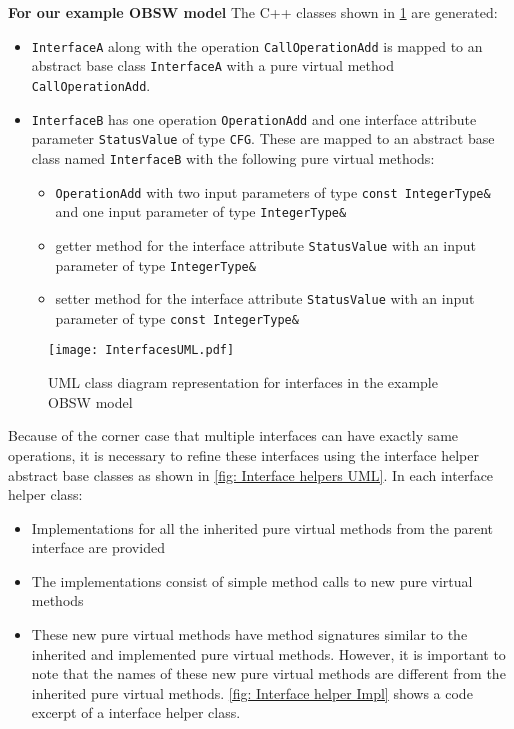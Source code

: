 \textbf{For our example OBSW model} The C++ classes shown in \cref{fig: InterfacesUML} are generated:
\begin{itemize}
\item \texttt{InterfaceA} along with the operation \texttt{CallOperationAdd} is mapped to an abstract base class \texttt{InterfaceA} with a pure virtual method \texttt{CallOperationAdd}. 
\item \texttt{InterfaceB} has one operation \texttt{OperationAdd} and one interface attribute parameter \texttt{StatusValue} of type \texttt{CFG}. These are mapped to an abstract base class named \texttt{InterfaceB} with the following pure virtual methods:
\begin{itemize}
\item \texttt{OperationAdd} with two input parameters of type \texttt{const\allowbreak \ IntegerType\&} and one input parameter of type \texttt{IntegerType\&}
\item getter method for the interface attribute \texttt{StatusValue} with an input parameter of type \texttt{IntegerType\&}
\item setter method for the interface attribute \texttt{StatusValue} with an input parameter of type \texttt{const\allowbreak \ IntegerType\&}
\end{itemize} 
\end{itemize}

\begin{figure}[h]
	\centering
	\texttt{[image: InterfacesUML.pdf]}
	\caption{UML class diagram representation for interfaces in the example OBSW model}
	\label{fig: InterfacesUML}
\end{figure}

Because of the corner case that multiple interfaces can have exactly same operations, it is necessary to refine these interfaces using the interface helper abstract base classes as shown in \cref{fig: Interface helpers UML}. In each interface helper class:
\begin{itemize}
\item Implementations for all the inherited pure virtual methods from the parent interface are provided
\item The implementations consist of simple method calls to new pure virtual methods
\item These new pure virtual methods have method signatures similar to the inherited and implemented pure virtual methods. However, it is important to note that the names of these new pure virtual methods are different from the inherited pure virtual methods. \cref{fig: Interface helper Impl} shows a code excerpt of a interface helper class. 
\end{itemize}

